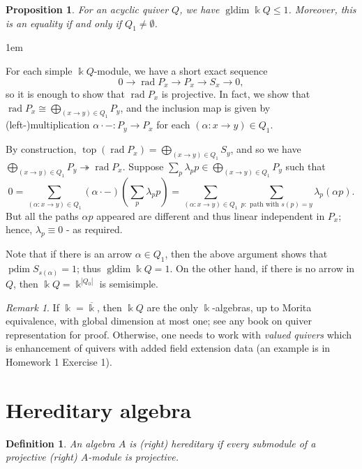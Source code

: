 \documentclass[11pt,a4paper]{article}
\makeatletter
\numberwithin{equation}{section}
\renewenvironment{proof}[1][\proofname]{\par
    \pushQED{\qed}%
    \normalfont \topsep0\p@\@plus6\p@ \labelsep1em\relax
    \trivlist
    \item[\hskip\labelsep\indent
        \bfseries #1]\ignorespaces
    \mbox{}
}{
    \popQED\endtrivlist\@endpefalse
}
\theoremstyle{all}
\newtheorem{proposition}[theorem]{Proposition}
\newtheorem{definition}[theorem]{Definition}
\theoremstyle{remark}
\newtheorem{remark}[theorem]{Remark}
\newcommand{\rad}{\operatorname{rad}\nolimits}
\renewcommand{\top}{\operatorname{top}\nolimits}
\newcommand{\pdim}{\operatorname{pdim}}
\newcommand{\gldim}{\operatorname{gldim}\nolimits}
\newcommand{\defn}[1]{\textsl{\color{darkblue} #1}}
\makeatother
\begin{document}
\begin{proposition}
For an acyclic quiver $Q$, we have $\gldim \Bbbk Q \leq 1$.
Moreover, this is an equality if and only if $Q_1\neq \emptyset$.
\end{proposition}
\begin{proof}
For each simple $\Bbbk Q$-module, we have a short exact sequence
\[
0\to \rad P_x \to P_x \to S_x \to 0,
\]
so it is enough to show that $\rad P_x$ is projective.  In fact, we show that $\rad P_x\cong \bigoplus_{(x\to y)\in Q_1} P_y$, and the inclusion map is given by (left-)multiplication $\alpha\cdot -: P_y \to P_x$ for each $(\alpha:x\to y)\in Q_1$.

By construction, $\top(\rad P_x)=\bigoplus_{(x\to y)\in Q_1} S_y$, and so we have $\bigoplus_{(x\to y)\in Q_1} P_y \twoheadrightarrow \rad P_x$.
Suppose $\sum_p \lambda_p p\in \bigoplus_{(x\to y)\in Q_1} P_y$ such that 
\[
0=\sum_{(\alpha:x\to y)\in Q_1} (\alpha\cdot-)(\sum_p \lambda_p p) = \sum_{(\alpha:x\to y)\in Q_1} \sum_{p:\text{ path with }s(p)=y} \lambda_p (\alpha p).
\]
But all the paths $\alpha p$ appeared are different and thus linear independent in $P_x$; hence, $\lambda_p\equiv 0$ - as required.

Note that if there is an arrow $\alpha \in Q_1$, then the above argument shows that $\pdim S_{s(\alpha)}=1$; thus $\gldim \Bbbk Q=1$.  On the other hand, if there is no arrow in $Q$, then $\Bbbk Q=\Bbbk^{|Q_0|}$ is semisimple.
\end{proof}
\begin{remark}
If $\Bbbk=\overline{\Bbbk}$, then $\Bbbk Q$ are the only $\Bbbk$-algebras, up to Morita equivalence, with global dimension at most one; see any book on quiver representation for proof.
Otherwise, one needs to work with \emph{valued quivers} which is enhancement of quivers with added field extension data (an example is in Homework 1 Exercise 1).
\end{remark}



\pagebreak

\section{Hereditary algebra}

\begin{definition}
An algebra $A$ is (right) \defn{hereditary} if every submodule of a projective (right) $A$-module is projective.
\end{definition}
\end{document}
